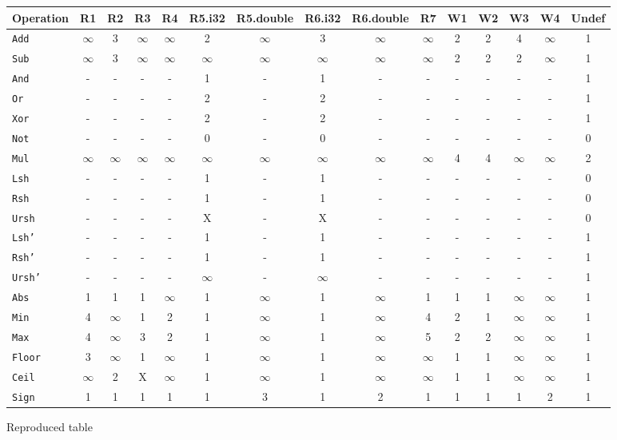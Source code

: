 \documentclass{article}
\begin{document}
\newcommand\oo{$\infty$}
\begin{figure}[t]
\small
\centering
\begin{tabular}{lccccccccc|cccc|c} \toprule
Operation &    \textbf{R1} & \textbf{R2} & \textbf{R3} & \textbf{R4} & \textbf{R5.i32} & \textbf{R5.double} & \textbf{R6.i32} & \textbf{R6.double} & \textbf{R7} & \textbf{W1} & \textbf{W2} & \textbf{W3} & \textbf{W4} & \textbf{Undef} \\ 
\midrule
\texttt{Add} & \oo & 3 & \oo & \oo & 2 & \oo & 3 & \oo & \oo & 2 & 2 & 4 & \oo & 1 \\
\texttt{Sub} & \oo & 3 & \oo & \oo & \oo & \oo & \oo & \oo & \oo & 2 & 2 & 2 & \oo & 1 \\
\texttt{And} & -  & -  & -  & -  & 1 & -  & 1 & -  & -  & -  & -  & -  & -  & 1 \\
\texttt{Or} & -  & -  & -  & -  & 2 & -  & 2 & -  & -  & -  & -  & -  & -  & 1 \\
\texttt{Xor} & -  & -  & -  & -  & 2 & -  & 2 & -  & -  & -  & -  & -  & -  & 1 \\
\texttt{Not} & -  & -  & -  & -  & 0 & -  & 0 & -  & -  & -  & -  & -  & -  & 0 \\
\texttt{Mul} & \oo & \oo & \oo & \oo & \oo & \oo & \oo & \oo & \oo & 4 & 4 & \oo & \oo & 2 \\
\texttt{Lsh} & -  & -  & -  & -  & 1 & -  & 1 & -  & -  & -  & -  & -  & -  & 0 \\
\texttt{Rsh} & -  & -  & -  & -  & 1 & -  & 1 & -  & -  & -  & -  & -  & -  & 0 \\
\texttt{Ursh} & -  & -  & -  & -  & X & -  & X & -  & -  & -  & -  & -  & -  & 0 \\
\texttt{Lsh'} & -  & -  & -  & -  & 1 & -  & 1 & -  & -  & -  & -  & -  & -  & 1 \\
\texttt{Rsh'} & -  & -  & -  & -  & 1 & -  & 1 & -  & -  & -  & -  & -  & -  & 1 \\
\texttt{Ursh'} & -  & -  & -  & -  & \oo & -  & \oo & -  & -  & -  & -  & -  & -  & 1 \\
\texttt{Abs} & 1 & 1 & 1 & \oo & 1 & \oo & 1 & \oo & 1 & 1 & 1 & \oo & \oo & 1 \\
\texttt{Min} & 4 & \oo & 1 & 2 & 1 & \oo & 1 & \oo & 4 & 2 & 1 & \oo & \oo & 1 \\
\texttt{Max} & 4 & \oo & 3 & 2 & 1 & \oo & 1 & \oo & 5 & 2 & 2 & \oo & \oo & 1 \\
\texttt{Floor} & 3 & \oo & 1 & \oo & 1 & \oo & 1 & \oo & \oo & 1 & 1 & \oo & \oo & 1 \\
\texttt{Ceil} & \oo & 2 & X & \oo & 1 & \oo & 1 & \oo & \oo & 1 & 1 & \oo & \oo & 1 \\
\texttt{Sign} & 1 & 1 & 1 & 1 & 1 & 3 & 1 & 2 & 1 & 1 & 1 & 1 & 2 & 1 \\
\end{tabular}
\vspace*{-3.5mm}
\caption{Reproduced table}
\end{figure}
\end{document}

